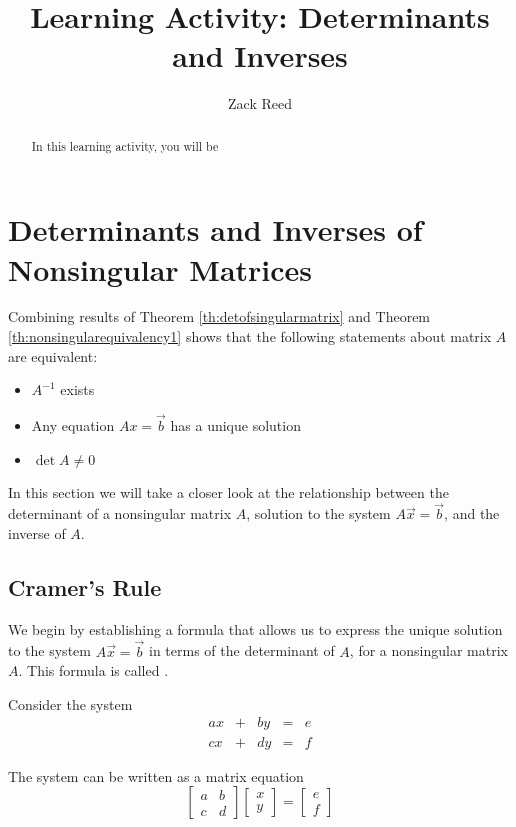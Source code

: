 \documentclass{ximera}
\author{Zack Reed}
\title{Learning Activity: Determinants and Inverses}
\begin{document}
\begin{abstract}

    In this learning activity, you will be 
\end{abstract}
\maketitle


\section*{Determinants and Inverses of Nonsingular Matrices}
 
Combining results of Theorem \ref{th:detofsingularmatrix} and Theorem \ref{th:nonsingularequivalency1} shows that the following statements about matrix $A$ are equivalent:
\begin{itemize}
\item $A^{-1}$ exists
\item Any equation $Ax=\vec{b}$ has a unique solution
\item $\det{A}\neq 0$
\end{itemize}
In this section we will take a closer look at the relationship between the determinant of a nonsingular matrix $A$, solution to the system $A\vec{x}=\vec{b}$, and the inverse of $A$. 
\subsection*{Cramer's Rule}
We begin by establishing a formula that allows us to express the unique solution to the system $A\vec{x}=\vec{b}$ in terms of the determinant of $A$, for a nonsingular matrix $A$.  This formula is called .
 
Consider the system
$$\begin{array}{ccccc}
      ax& +&by&=&e\\
      cx & +&dy&= &f
    \end{array}$$
     
 The system can be written as a matrix equation
 $$\begin{bmatrix}a&b\\c&d\end{bmatrix}\begin{bmatrix}x\\y\end{bmatrix}=\begin{bmatrix}e\\f\end{bmatrix}$$
  
\end{document}
